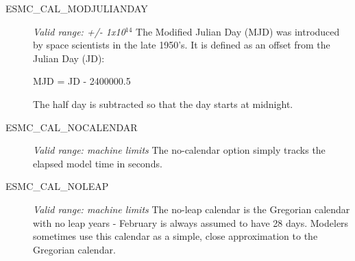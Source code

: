 \begin{description}
\item [ESMC\_CAL\_MODJULIANDAY]
{\it Valid range:  +/- 1x10$^{14}$}
\newline The Modified Julian Day (MJD) was introduced by space scientists in
 the late 1950's.  It is defined as an offset from the Julian Day (JD):

MJD = JD - 2400000.5

The half day is subtracted so that the day starts at midnight.

\item [ESMC\_CAL\_NOCALENDAR] 
{\it Valid range: machine limits}
\newline The no-calendar option simply tracks the elapsed model time in seconds.

\item [ESMC\_CAL\_NOLEAP]
{\it Valid range: machine limits} 
\newline The no-leap calendar is the Gregorian calendar with no leap years - 
February is always assumed to have 28 days.  Modelers sometimes use this 
calendar as a simple, close approximation to the Gregorian calendar.

\end{description}
